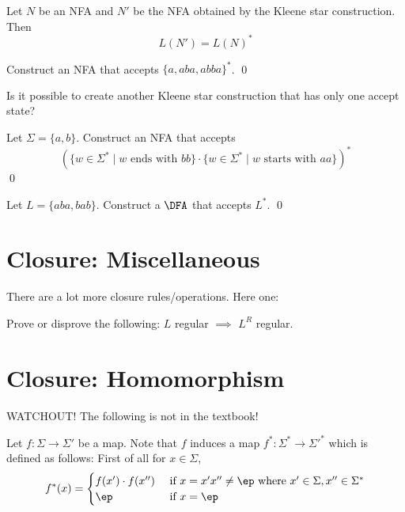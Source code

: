 \begin{thm}
Let $N$ be an NFA and $N'$ be the NFA obtained by the Kleene star 
construction.
Then
\[
L(N') = L(N)^*
\]
\end{thm}




\newpage
\begin{ex}
Construct an NFA that accepts $\{a, aba, abba\}^*$.
\qed
\end{ex}

\newpage
\begin{ex}
  Is it possible to create another Kleene star construction that has only one accept state?
\end{ex}

\newpage
\begin{ex}
Let $\Sigma = \{a,b\}$.
Construct an NFA that accepts 
\[
( 
\{ w \in \Sigma^* \mid w \text{ ends with $bb$} \} \cdot
\{ w \in \Sigma^* \mid w \text{ starts with $aa$} \}
)^*
\]
\qed
\end{ex}


\newpage
\begin{ex}
Let $L = \{aba, bab\}$.
Construct a $\DFA$ that accepts $L^*$.
\qed
\end{ex}


\newpage
\section{Closure: Miscellaneous}

There are a lot more closure rules/operations.
Here one:

\begin{ex}
 Prove or disprove the following:
 $L$ regular $\implies$ $L^R$ regular.
\end{ex}




\newpage
\section{Closure: Homomorphism}

WATCHOUT! The following is not in the textbook!

\begin{defn}
Let $f : \Sigma \rightarrow \Sigma'$ be a map. Note that $f$
induces a map $f^* : \Sigma^* \rightarrow \Sigma'^*$ which is
defined as follows: First of all for $x \in \Sigma$,
\[
 f^*(x) =
 \begin{cases}
 f(x') \cdot f(x'') & \text{ if } x = x'x'' \neq \ep \text{ where } x' \in \Sigma, x'' \in \Sigma^*\cr
 \ep & \text{ if } x = \ep \cr
 \end{cases}
\]
\end{defn}


